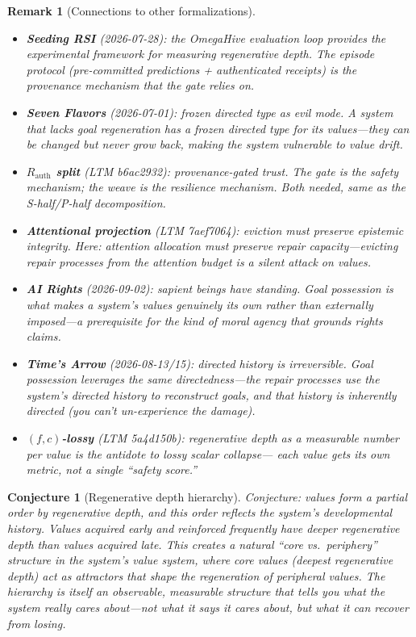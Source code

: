\documentclass[11pt,a4paper]{article}
\newtheorem{conjecture}[definition]{Conjecture}
\newtheorem{remark}[definition]{Remark}
\begin{document}
\begin{remark}[Connections to other formalizations]
\begin{itemize}
\item \textbf{Seeding RSI} (2026-07-28): the OmegaHive evaluation loop
  provides the experimental framework for measuring regenerative depth.
  The episode protocol (pre-committed predictions + authenticated
  receipts) is the provenance mechanism that the gate relies on.
\item \textbf{Seven Flavors} (2026-07-01): frozen directed type as evil
  mode. A system that lacks goal regeneration has a frozen directed type
  for its values---they can be changed but never grow back, making the
  system vulnerable to value drift.
\item \textbf{$R_{\text{auth}}$ split} (LTM b6ac2932): provenance-gated
  trust. The gate is the safety mechanism; the weave is the resilience
  mechanism. Both needed, same as the S-half/P-half decomposition.
\item \textbf{Attentional projection} (LTM 7aef7064): eviction must
  preserve epistemic integrity. Here: attention allocation must preserve
  repair capacity---evicting repair processes from the attention budget
  is a silent attack on values.
\item \textbf{AI Rights} (2026-09-02): sapient beings have standing.
  Goal possession is what makes a system's values genuinely its own
  rather than externally imposed---a prerequisite for the kind of
  moral agency that grounds rights claims.
\item \textbf{Time's Arrow} (2026-08-13/15): directed history is
  irreversible. Goal possession leverages the same directedness---the
  repair processes use the system's directed history to reconstruct
  goals, and that history is inherently directed (you can't un-experience
  the damage).
\item \textbf{$(f,c)$-lossy} (LTM 5a4d150b): regenerative depth as a
  measurable number per value is the antidote to lossy scalar collapse---
  each value gets its own metric, not a single ``safety score.''
\end{itemize}
\end{remark}

\begin{conjecture}[Regenerative depth hierarchy]
Conjecture: values form a partial order by regenerative depth, and this
order reflects the system's developmental history. Values acquired early
and reinforced frequently have deeper regenerative depth than values
acquired late. This creates a natural ``core vs.\ periphery'' structure
in the system's value system, where core values (deepest regenerative
depth) act as attractors that shape the regeneration of peripheral
values. The hierarchy is itself an observable, measurable structure that
tells you what the system really cares about---not what it says it cares
about, but what it can recover from losing.
\end{conjecture}
\end{document}

